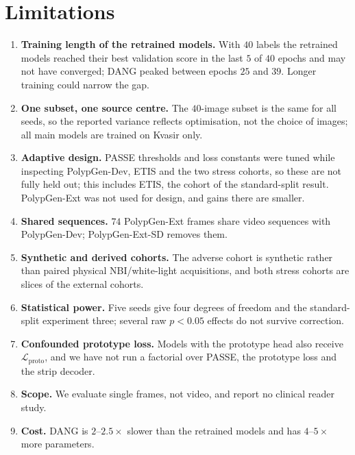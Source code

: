 \documentclass[10pt,twocolumn]{article}
\begin{document}
\section{Limitations}
\label{sec:limits}
\begin{enumerate}
  \item \textbf{Training length of the retrained models.} With $40$ labels the retrained models reached their best validation score in the last $5$ of $40$ epochs and may not have converged; DANG peaked between epochs $25$ and $39$. Longer training could narrow the gap.
  \item \textbf{One subset, one source centre.} The $40$-image subset is the same for all seeds, so the reported variance reflects optimisation, not the choice of images; all main models are trained on Kvasir only.
  \item \textbf{Adaptive design.} PASSE thresholds and loss constants were tuned while inspecting PolypGen-Dev, ETIS and the two stress cohorts, so these are not fully held out; this includes ETIS, the cohort of the standard-split result. PolypGen-Ext was not used for design, and gains there are smaller.
  \item \textbf{Shared sequences.} $74$ PolypGen-Ext frames share video sequences with PolypGen-Dev; PolypGen-Ext-SD removes them.
  \item \textbf{Synthetic and derived cohorts.} The adverse cohort is synthetic rather than paired physical NBI/white-light acquisitions, and both stress cohorts are slices of the external cohorts.
  \item \textbf{Statistical power.} Five seeds give four degrees of freedom and the standard-split experiment three; several raw $p<0.05$ effects do not survive correction.
  \item \textbf{Confounded prototype loss.} Models with the prototype head also receive $\mathcal{L}_{\text{proto}}$, and we have not run a factorial over PASSE, the prototype loss and the strip decoder.
  \item \textbf{Scope.} We evaluate single frames, not video, and report no clinical reader study.
  \item \textbf{Cost.} DANG is $2$--$2.5\times$ slower than the retrained models and has $4$--$5\times$ more parameters.
\end{enumerate}
\end{document}
